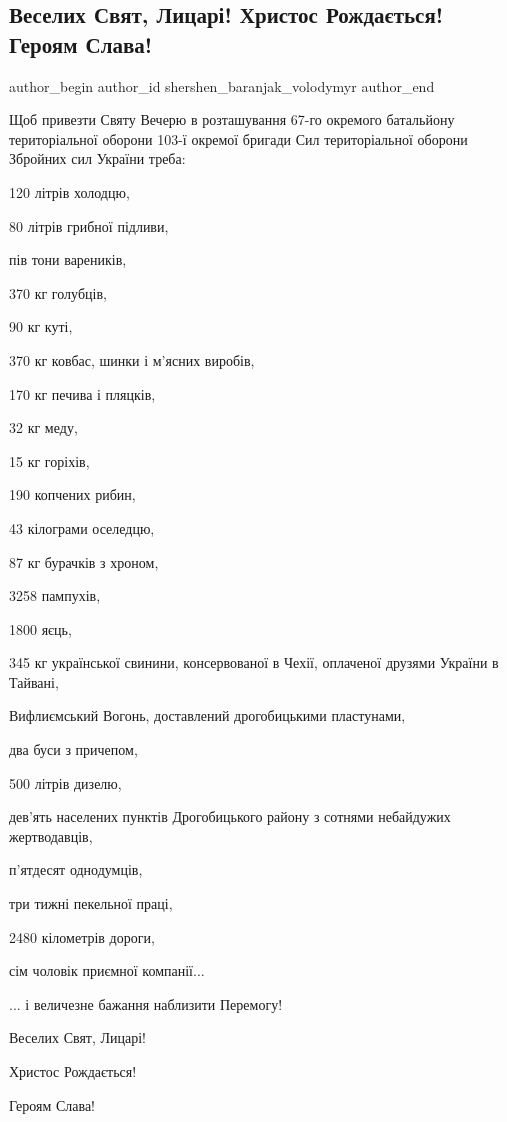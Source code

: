  
 
 
 
 

\subsection{Веселих Свят, Лицарі! Христос Рождається! Героям Слава!}
\label{sec:05_01_2023.fb.shershen_baranjak_volodymyr.1.veselikh_svyat__lits}

\ifcmt
 author_begin
   author_id shershen_baranjak_volodymyr
 author_end
\fi

Щоб привезти Святу Вечерю в розташування 67-го окремого батальйону
територіальної оборони 103-ї окремої бригади Сил територіальної оборони
Збройних сил України треба:

120 літрів холодцю,

80 літрів грибної підливи, 

пів тони вареників, 

370 кг голубців, 

90 кг куті, 

370 кг ковбас, шинки і м'ясних виробів, 

170 кг печива і пляцків, 

32 кг меду, 

15 кг горіхів,

190 копчених рибин, 

43 кілограми оселедцю, 

87 кг бурачків з хроном, 

3258 пампухів, 

1800 яєць,  

345 кг української свинини, консервованої в Чехії, оплаченої друзями України в
Тайвані,

Вифлиємський Вогонь, доставлений дрогобицькими пластунами, 

два буси з причепом, 

500 літрів дизелю, 

дев'ять населених пунктів Дрогобицького району з сотнями небайдужих
жертводавців,

п'ятдесят однодумців, 

три тижні пекельної праці, 

2480 кілометрів дороги, 

сім чоловік приємної компанії...

... і величезне бажання наблизити Перемогу!

Веселих Свят, Лицарі! 

Христос Рождається!

Героям Слава!
